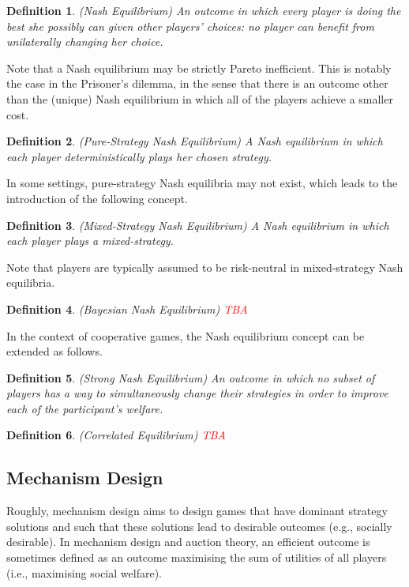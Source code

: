 \documentclass{article}
\newtheorem{definition}{Definition}
\begin{document}
\begin{definition}
(Nash Equilibrium) An outcome in which every player is doing the best she possibly can given other players' choices: no player can benefit from unilaterally changing her choice.
\end{definition}

Note that a Nash equilibrium may be strictly Pareto inefficient. This is notably the case in the Prisoner's dilemma, in the sense that there is an outcome other than the (unique) Nash equilibrium in which all of the players achieve a smaller cost.

\begin{definition}
(Pure-Strategy Nash Equilibrium) A Nash equilibrium in which each player deterministically plays her chosen strategy.
\end{definition}

In some settings, pure-strategy Nash equilibria may not exist, which leads to the introduction of the following concept.

\begin{definition}
(Mixed-Strategy Nash Equilibrium) A Nash equilibrium in which each player plays a mixed-strategy.
\end{definition}

Note that players are typically assumed to be risk-neutral in mixed-strategy Nash equilibria.

\begin{definition}
(Bayesian Nash Equilibrium) \textcolor{red}{TBA}
\end{definition}

In the context of cooperative games, the Nash equilibrium concept can be extended as follows.

\begin{definition}
(Strong Nash Equilibrium) An outcome in which no subset of players has a way to simultaneously change their strategies in order to improve each of the participant's welfare.
\end{definition}

\begin{definition}
(Correlated Equilibrium) \textcolor{red}{TBA}
\end{definition}

\subsection{Mechanism Design}

Roughly, mechanism design aims to design games that have dominant strategy solutions and such that these solutions lead to desirable outcomes (e.g., socially desirable). In mechanism design and auction theory, an efficient outcome is sometimes defined as an outcome maximising the sum of utilities of all players (i.e., maximising social welfare).
\end{document}
